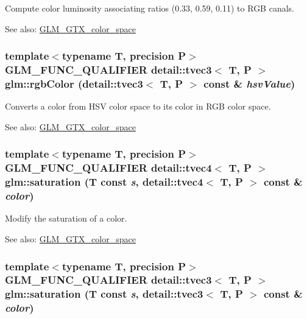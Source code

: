 Compute color luminosity associating ratios (0.33, 0.59, 0.11) to RGB canals. \begin{Desc}
\item[See also:]\hyperlink{group__gtx__color__space}{GLM\_\-GTX\_\-color\_\-space} \end{Desc}
\hypertarget{group__gtx__color__space_g35a9210371395c95b185f5aac6c0020e}{
\subsubsection[rgbColor]{\setlength{\rightskip}{0pt plus 5cm}template$<$typename T, precision P$>$ GLM\_\-FUNC\_\-QUALIFIER detail::tvec3$<$ T, P $>$ glm::rgbColor (detail::tvec3$<$ T, P $>$ const \& {\em hsvValue})}}
\label{group__gtx__color__space_g35a9210371395c95b185f5aac6c0020e}


Converts a color from HSV color space to its color in RGB color space. \begin{Desc}
\item[See also:]\hyperlink{group__gtx__color__space}{GLM\_\-GTX\_\-color\_\-space} \end{Desc}
\hypertarget{group__gtx__color__space_g1ab05270ac2afa8e67b0d268e5c92573}{
\subsubsection[saturation]{\setlength{\rightskip}{0pt plus 5cm}template$<$typename T, precision P$>$ GLM\_\-FUNC\_\-QUALIFIER detail::tvec4$<$ T, P $>$ glm::saturation (T const {\em s}, \/  detail::tvec4$<$ T, P $>$ const \& {\em color})}}
\label{group__gtx__color__space_g1ab05270ac2afa8e67b0d268e5c92573}


Modify the saturation of a color. \begin{Desc}
\item[See also:]\hyperlink{group__gtx__color__space}{GLM\_\-GTX\_\-color\_\-space} \end{Desc}
\hypertarget{group__gtx__color__space_gc45433ff3d2f2f3657edfcf9ee24800d}{
\subsubsection[saturation]{\setlength{\rightskip}{0pt plus 5cm}template$<$typename T, precision P$>$ GLM\_\-FUNC\_\-QUALIFIER detail::tvec3$<$ T, P $>$ glm::saturation (T const {\em s}, \/  detail::tvec3$<$ T, P $>$ const \& {\em color})}}
\label{group__gtx__color__space_gc45433ff3d2f2f3657edfcf9ee24800d}


